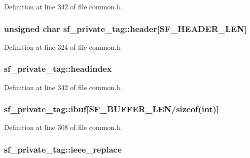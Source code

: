 Definition at line 342 of file common.\+h.

\subsubsection[{\texorpdfstring{header}{header}}]{\setlength{\rightskip}{0pt plus 5cm}unsigned char sf\+\_\+private\+\_\+tag\+::header\mbox{[}{\bf S\+F\+\_\+\+H\+E\+A\+D\+E\+R\+\_\+\+L\+EN}\mbox{]}}\hypertarget{structsf__private__tag_a0cf96c0a7464d4333f992bdb5b0034c4}{}\label{structsf__private__tag_a0cf96c0a7464d4333f992bdb5b0034c4}


Definition at line 324 of file common.\+h.

\subsubsection[{\texorpdfstring{headindex}{headindex}}]{ sf\+\_\+private\+\_\+tag\+::headindex}\hypertarget{structsf__private__tag_a45506b1c2fefbd78e955364b7664a820}{}\label{structsf__private__tag_a45506b1c2fefbd78e955364b7664a820}


Definition at line 342 of file common.\+h.

\subsubsection[{\texorpdfstring{ibuf}{ibuf}}]{ sf\+\_\+private\+\_\+tag\+::ibuf\mbox{[}{\bf S\+F\+\_\+\+B\+U\+F\+F\+E\+R\+\_\+\+L\+EN}/sizeof({\bf int})\mbox{]}}\hypertarget{structsf__private__tag_a1c137cad3cb10b06728f6a42d38eccef}{}\label{structsf__private__tag_a1c137cad3cb10b06728f6a42d38eccef}


Definition at line 308 of file common.\+h.

\subsubsection[{\texorpdfstring{ieee\+\_\+replace}{ieee_replace}}]{ sf\+\_\+private\+\_\+tag\+::ieee\+\_\+replace}\hypertarget{structsf__private__tag_ac4affe0199d7a84f17e4f19c1120df3e}{}\label{structsf__private__tag_ac4affe0199d7a84f17e4f19c1120df3e}


